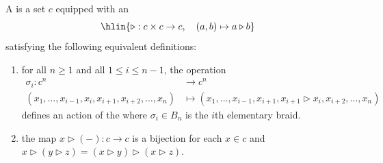 \begin{definition} \label{definition:rack} 	
    A  is a set $c$ equipped with an  
    $$\hlin{\triangleright: c \times c 	\to c, \quad (a,b) \mapsto a \triangleright b}$$
    satisfying the following equivalent definitions:
    \begin{enumerate}
        \item for all $n \geq 1$ and all $1 \leq i \leq n-1$, the operation
        \begin{align*} 		\sigma_i : c^n & \rightarrow c^n \\ 		(x_1, \ldots, x_{i-1}, x_i, x_{i+1}, x_{i+2}, \ldots, x_n) & \mapsto 		(x_1, \ldots, x_{i-1}, x_{i+1}, x_{i+1} \triangleright x_i, x_{i+2}, \ldots, 		x_n) 	\end{align*}
        defines an action of the  where $\sigma_i \in B_n$ is the $i$th elementary braid.
        
        \item the map $x \triangleright (-): c \to c$ is a bijection for each $x \in c$ and $x \triangleright (y \triangleright z) = (x \triangleright y) \triangleright (x \triangleright z)$. 
    \end{enumerate}
\end{definition}